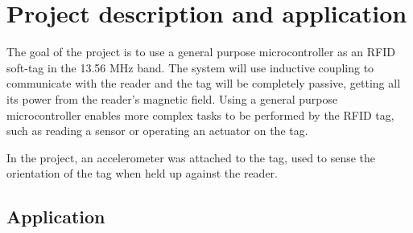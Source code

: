 \section{Project description and application}
The goal of the project is to use a general purpose microcontroller as an RFID soft-tag in the 13.56 MHz band.
The system will use inductive coupling to communicate with the reader and the tag will be completely passive, getting all its power from the reader's magnetic field.
Using a general purpose microcontroller enables more complex tasks to be performed by the RFID tag, such as reading a sensor or operating an actuator on the tag.

In the project, an accelerometer was attached to the tag, used to sense the orientation of the tag when held up against the reader.

\subsection{Application}

